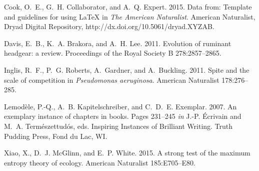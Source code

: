 \documentclass[11pt]{article}
\begin{document}



\newpage{}


%
\begin{thebibliography}{}

Cook, O.~E., G.~H. Collaborator, and A.~Q. Expert. 2015.
\newblock Data from: Template and guidelines for using \LaTeX{} 
in \textit{The American Naturalist}.
\newblock American Naturalist, Dryad Digital Repository, 
http://dx.doi.org/10.5061/dryad.XYZAB.

Davis, E.~B., K.~A. Brakora, and A.~H. Lee. 2011.
\newblock Evolution of ruminant headgear: a review.
\newblock Proceedings of the Royal Society B 278:2857--2865.

Inglis, R.~F., P.~G. Roberts, A.~Gardner, and A.~Buckling. 2011.
\newblock Spite and the scale of competition in \textit{Pseudomonas
  aeruginosa}.
\newblock American Naturalist 178:276--285.

Lemod\`{e}le, P.-Q., A.~B. Kapitelschreiber, and C.~D.~E. Exemplar. 2007.
\newblock An exemplary instance of chapters in books.
\newblock Pages 231--245 \emph{in} J.-P. \'{E}crivain and M.~A. 
Term\'{e}szettud\'{o}s, eds. Inspiring Instances of Brilliant Writing. 
Truth Pudding Press, Fond du Lac, WI.

Xiao, X., D.~J. McGlinn, and E.~P. White. 2015.
\newblock A strong test of the maximum entropy theory of ecology.
\newblock American Naturalist 185:E705--E80.

\end{thebibliography}
\end{document}
